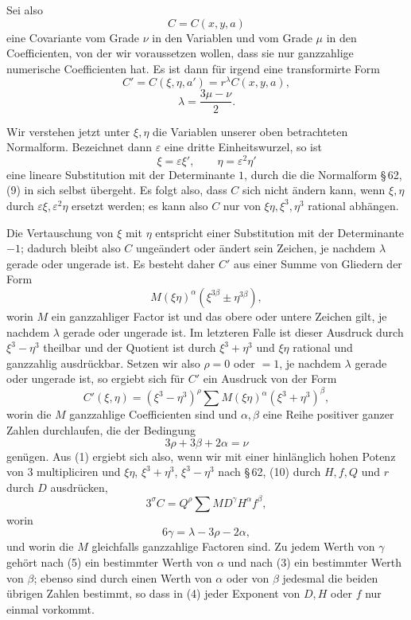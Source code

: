 \documentclass[11pt]{article}
\providecommand{\eps}{\varepsilon}
\begin{document}
Sei also
\[
 C=C(x,y,a)
\]
eine Covariante vom Grade $\nu$ in den Variablen und vom Grade $\mu$ in den Coefficienten, von der wir voraussetzen wollen, dass sie nur ganzzahlige numerische Coefficienten hat. Es ist dann für irgend eine transformirte Form
\begin{equation}
 C'=C(\xi,\eta,a')=r^\lambda C(x,y,a),
\tag{1}
\end{equation}
\begin{equation}
 \lambda=\frac{3\mu-\nu}{2}.
\tag{2}
\end{equation}

Wir verstehen jetzt unter $\xi,\eta$ die Variablen unserer oben betrachteten Normalform. Bezeichnet dann $\eps$ eine dritte Einheitswurzel, so ist
\[
 \xi=\eps\xi',\qquad \eta=\eps^2\eta'
\]
eine lineare Substitution mit der Determinante $1$, durch die die Normalform \S\,62, (9) in sich selbst übergeht. Es folgt also, dass $C$ sich nicht ändern kann, wenn $\xi,\eta$ durch $\eps\xi,\eps^2\eta$ ersetzt werden; es kann also $C$ nur von $\xi\eta,\xi^3,\eta^3$ rational abhängen.

Die Vertauschung von $\xi$ mit $\eta$ entspricht einer Substitution mit der Determinante $-1$; dadurch bleibt also $C$ ungeändert oder ändert sein Zeichen, je nachdem $\lambda$ gerade oder ungerade ist. Es besteht daher $C'$ aus einer Summe von Gliedern der Form
\[
 M(\xi\eta)^\alpha(\xi^{3\beta}\pm\eta^{3\beta}),
\]
worin $M$ ein ganzzahliger Factor ist und das obere oder untere Zeichen gilt, je nachdem $\lambda$ gerade oder ungerade ist. Im letzteren Falle ist dieser Ausdruck durch $\xi^3-\eta^3$ theilbar und der Quotient ist durch $\xi^3+\eta^3$ und $\xi\eta$ rational und ganzzahlig ausdrückbar. Setzen wir also $\rho=0$ oder $=1$, je nachdem $\lambda$ gerade oder ungerade ist, so ergiebt sich für $C'$ ein Ausdruck von der Form
\[
 C'(\xi,\eta)=(\xi^3-\eta^3)^\rho\sum M(\xi\eta)^\alpha(\xi^3+\eta^3)^\beta,
\]
worin die $M$ ganzzahlige Coefficienten sind und $\alpha,\beta$ eine Reihe positiver ganzer Zahlen durchlaufen, die der Bedingung
\begin{equation}
 3\rho+3\beta+2\alpha=\nu
\tag{3}
\end{equation}
genügen. Aus (1) ergiebt sich also, wenn wir mit einer hinlänglich hohen Potenz von $3$ multipliciren und $\xi\eta$, $\xi^3+\eta^3$, $\xi^3-\eta^3$ nach \S\,62, (10) durch $H,f,Q$ und $r$ durch $D$ ausdrücken,
\begin{equation}
 3^\sigma C=Q^\rho\sum M D^\gamma H^\alpha f^\beta,
\tag{4}
\end{equation}
worin
\begin{equation}
 6\gamma=\lambda-3\rho-2\alpha,
\tag{5}
\end{equation}
und worin die $M$ gleichfalls ganzzahlige Factoren sind. Zu jedem Werth von $\gamma$ gehört nach (5) ein bestimmter Werth von $\alpha$ und nach (3) ein bestimmter Werth von $\beta$; ebenso sind durch einen Werth von $\alpha$ oder von $\beta$ jedesmal die beiden übrigen Zahlen bestimmt, so dass in (4) jeder Exponent von $D,H$ oder $f$ nur einmal vorkommt.
\end{document}
